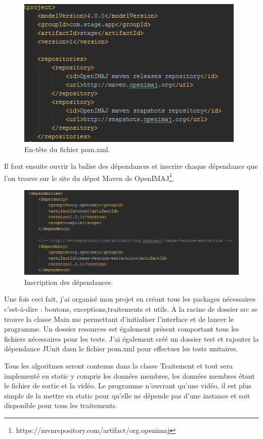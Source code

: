 \documentclass[10pt,a4paper]{article}
\begin{document}
\begin{figure}[!h]
\center
\includegraphics[scale = 1]{rapport.PNG}
\caption{En-tête du fichier pom.xml.}
\end{figure}

Il faut ensuite ouvrir la balise des dépendances et inscrire chaque dépendance que l'on trouve sur le site du dépot Maven de OpenIMAJ\footnote{https://mvnrepository.com/artifact/org.openimaj}.

\begin{figure}[h]
\includegraphics[scale = 1,inner]{dependance.PNG}
\caption{Inscription des dépendances.}
\end{figure}

Une fois ceci fait, j'ai organisé mon projet en créant tous les packages nécessaires c'est-à-dire : boutons, exceptions,traitements et utils.
A la racine de dossier src se trouve la classe Main me permettant d'initialiser l'interface et de lancer le programme. Un dossier resources est également présent comportant tous les fichiers
nécessaires pour les tests. J'ai également créé un dossier test et rajouter la dépendance JUnit dasn le fichier pom.xml pour effectuer les tests unitaires.

Tous les algoritmes seront contenus dans la classe Traitement et tout sera implementé en static y compris les données membres, les données membres étant le fichier de sortie et la vidéo.
Le programme n'ouvrant qu'une vidéo, il est plus simple de la mettre en static pour qu'elle ne dépende pas d'une instance et soit disponible pour tous les traitements.
\end{document}
